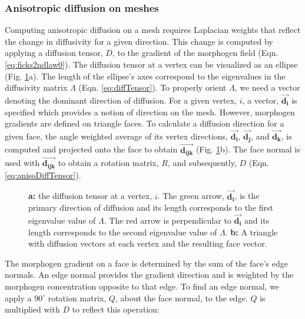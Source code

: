\subsubsection*{Anisotropic diffusion on meshes}


Computing anisotropic diffusion on a mesh requires Laplacian weights that reflect the change in diffusivity for a given direction. This change is computed by applying a diffusion tensor, $D$, to the gradient of the morphogen field (Eqn. \ref{eq:ficks2ndlaw0}). The diffusion tensor at a vertex can be visualized as an ellipse (Fig. \ref{fig:anisoMesh}a). The length of the ellipse's axes correspond to the eigenvalues in the diffusivity matrix $\Lambda$ (Eqn. \ref{eq:diffTensor}). To properly orient $\Lambda$, we need a vector denoting the dominant direction of diffusion. For a given vertex, $i$, a vector, $\boldsymbol{\vec{d_i}}$ is specified which provides a notion of direction on the mesh. However, morphogen gradients are defined on triangle faces. To calculate a diffusion direction for a given face, the angle weighted average of its vertex directions, $\boldsymbol{\vec{d_i}}$, $\boldsymbol{\vec{d_j}}$, and $\boldsymbol{\vec{d_k}}$, is computed and projected onto the face to obtain $\boldsymbol{\vec{d_{ijk}}}$ (Fig. \ref{fig:anisoMesh}b). The face normal is used with $\boldsymbol{\vec{d_{ijk}}}$ to obtain a rotation matrix, $R$, and subsequently, $D$ (Eqn. \ref{eq:anisoDiffTensor}). 
\begin{figure}[H]
	\centering
	\caption{\textbf{a:} the diffusion tensor at a vertex, $i$. The green arrow, $\boldsymbol{\vec{d_i}}$, is the primary direction of diffusion and its length corresponds to the first eigenvalue value of $\Lambda$. The red arrow is perpendicular to $\boldsymbol{\vec{d_i}}$ and its length corresponds to the second eigenvalue value of $\Lambda$. \textbf{b:} A triangle with diffusion vectors at each vertex and the resulting face vector.}
	\label{fig:anisoMesh}
\end{figure}
The morphogen gradient on a face is determined by the sum of the face's edge normals. An edge normal provides the gradient direction and is weighted by the morphogen concentration opposite to that edge. To find an edge normal, we apply a $90^\circ$ rotation matrix, $Q$, about the face normal, to the edge. $Q$ is multiplied with $D$ to reflect this operation:
